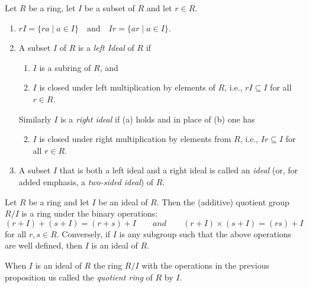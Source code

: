 \documentclass[../main]{subfiles}
\begin{document}
\begin{dfn}
 Let $R$ be a ring, let $I$ be a subset of $R$ and let $r \in R$.
 \begin{enumerate}
  \item $rI = \{ra \mid a\in I\} \quad \text{and} \quad Ir = \{ar \mid a\in I\}$.
  
  \item A subset $I$ of $R$ is a \textit{left Ideal} of $R$ if 
  \begin{enumerate}
   \item $I$ is a subring of $R$, and 
   
   \item $I$ is closed under left multiplication by elements of $R$, i.e., $rI \subseteq I$ for all $r\in R$.
  \end{enumerate}
  
  Similarly $I$ is a \textit{right ideal} if (a) holds and in place of (b) one has 
  
  \begin{enumerate}[label = {(\alph*)'}]
  \setcounter{enumii}{1}
   \item $I$ is closed under right multiplication by elements from $R$, i.e., $Ir \subseteq I$ for all $r \in R$.
  \end{enumerate}
  
  \item A subset $I$ that is both a left ideal and a right ideal is called an \textit{ideal} (or, for added emphasis, a \textit{two-sided ideal}) of $R$.
 \end{enumerate}
\end{dfn}


\begin{prop}
 Let $R$ be a ring and let $I$ be an ideal of $R$. Then the (additive) quotient group $R/I$ is a ring under the binary operations:
 \[ (r + I) + (s + I) = (r+s)+I \qquad \textit{and} \qquad (r+I)\times (s+I) = (rs) +I \]
 for all $r,s \in R$. Conversely, if $I$ is any subgroup such that the above operations are well defined, then $I$ is an ideal of $R$. 
\end{prop}


\begin{dfn}
 When $I$ is an ideal of $R$ the ring $R/I$ with the operations in the previous proposition us called the \textit{quotient ring} of $R$ by $I$.
\end{dfn}
\end{document}
